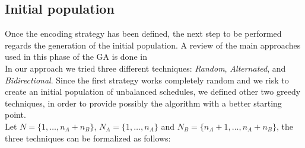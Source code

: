 \documentclass[opre,nonblindrev]{informs3} %
\begin{document}
\subsection{Initial population}
Once the encoding strategy has been defined, the next step to be performed regards the generation of the initial population. A review of the main approaches used in this phase of the GA is done in \cite{init1}\\
In our approach we tried three different techniques: \textit{Random}, \textit{Alternated}, and \textit{Bidirectional}. Since the first strategy works completely random and we risk to create an initial population of unbalanced schedules, we defined other two greedy techniques, in order to provide possibly the algorithm with a better starting point.\\
Let $N = \{1,\ldots,n_A+n_B\}$, $N_A =\{1,\ldots,n_A\}$ and $N_B=\{n_A+1,\ldots,n_A+n_B\}$, the three techniques can be formalized as follows:
\end{document}
